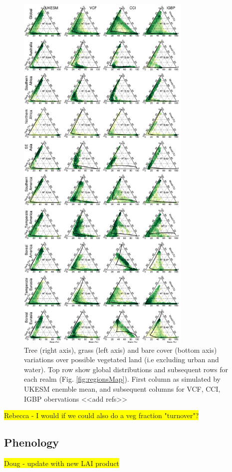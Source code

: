 \documentclass[bg, manuscript]{copernicus}
\newcommand{\hilight}[1]{\colorbox{yellow}{#1}}
\begin{document}
\begin{figure}[t]
\includegraphics[width=8.3cm]{figs/VegDist/VegDistTriangle.png}
\caption{Tree (right axis), grass (left axis) and bare cover (bottom axis) variations over possible vegetated land (i.e excluding urban and water). Top row show global distributions and subsequent rows for each realm (Fig. \ref{fig:regionsMap}). First column as simulated by UKESM enemble mean, and subsequent columns for VCF, CCI, IGBP obervations <<add refs>> \label{fig:VegDistTri}}
\end{figure}


\hilight{Rebecca - I would if we could also do a veg fraction "turnover"?}

\subsection{Phenology}

\hilight{Doug - update with new LAI product}
\end{document}
